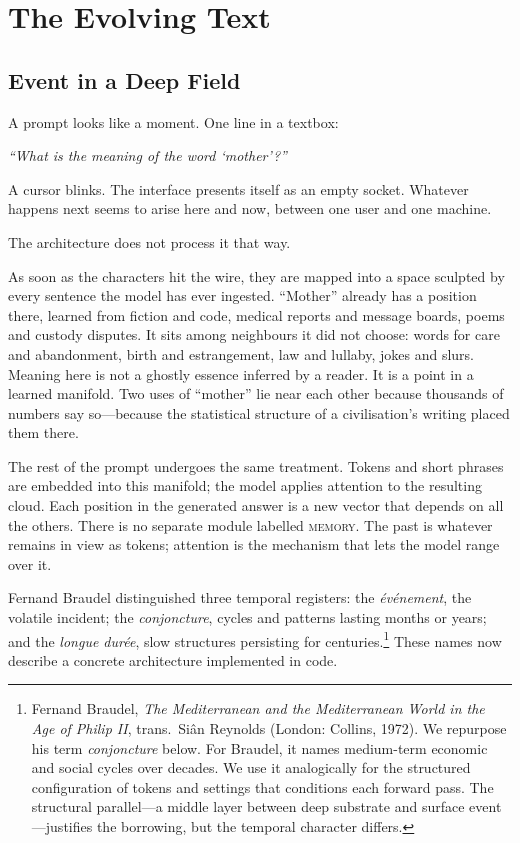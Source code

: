 \chapter{The Evolving Text}

\section{Event in a Deep Field}

A prompt looks like a moment. One line in a textbox:

\emph{``What is the meaning of the word `mother'?''}

A cursor blinks. The interface presents itself as an empty socket. Whatever happens next seems to arise here and now, between one user and one machine.

The architecture does not process it that way.

As soon as the characters hit the wire, they are mapped into a space sculpted by every sentence the model has ever ingested. ``Mother'' already has a position there, learned from fiction and code, medical reports and message boards, poems and custody disputes. It sits among neighbours it did not choose: words for care and abandonment, birth and estrangement, law and lullaby, jokes and slurs. Meaning here is not a ghostly essence inferred by a reader. It is a point in a learned manifold. Two uses of ``mother'' lie near each other because thousands of numbers say so---because the statistical structure of a civilisation's writing placed them there.

The rest of the prompt undergoes the same treatment. Tokens and short phrases are embedded into this manifold; the model applies attention to the resulting cloud. Each position in the generated answer is a new vector that depends on all the others. There is no separate module labelled \textsc{memory}. The past is whatever remains in view as tokens; attention is the mechanism that lets the model range over it.

Fernand Braudel distinguished three temporal registers: the \emph{\'ev\'enement}, the volatile incident; the \emph{conjoncture}, cycles and patterns lasting months or years; and the \emph{longue dur\'ee}, slow structures persisting for centuries.\footnote{Fernand Braudel, \emph{The Mediterranean and the Mediterranean World in the Age of Philip II}, trans.\ Si\^{a}n Reynolds (London: Collins, 1972). We repurpose his term \emph{conjoncture} below. For Braudel, it names medium-term economic and social cycles over decades. We use it analogically for the structured configuration of tokens and settings that conditions each forward pass. The structural parallel---a middle layer between deep substrate and surface event---justifies the borrowing, but the temporal character differs.} These names now describe a concrete architecture implemented in code.

